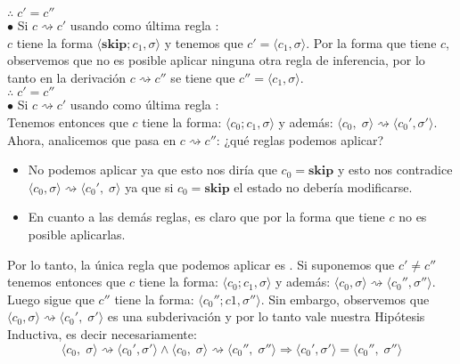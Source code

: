 \documentclass[11pt, fleqn]{article}
\begin{document}
$\therefore \; c' = c''$ \\



$\bullet$ Si $ c \rightsquigarrow c' $ usando como última regla : \\
$c$ tiene la forma $\langle \textbf{skip};c_1, \sigma \rangle$ y tenemos que $c' = \langle c_1, \sigma \rangle$.
Por la forma que tiene $c$, observemos que no es posible aplicar ninguna otra regla
de inferencia, por lo tanto en la derivación $ c \rightsquigarrow c'' $ se tiene que
$c'' = \langle c_1, \sigma \rangle$. \\

$\therefore \; c' = c''$ \\


$\bullet$ Si $ c \rightsquigarrow c' $ usando como última regla : \\
Tenemos entonces que $c$ tiene la forma: $\langle c_0;c_1, \sigma \rangle$ y
además:  $ \langle c_0, \; \sigma \rangle \rightsquigarrow \langle c_0', \sigma' \rangle$.
Ahora, analicemos que pasa en $ c \rightsquigarrow c'' $: ¿qué reglas podemos aplicar?

\begin{itemize}
      \item No podemos aplicar  ya que esto nos diría que $c_0 = \textbf{skip}$ y esto
            nos contradice $ \langle c_0, \sigma \rangle \rightsquigarrow \langle c_0', \; \sigma \rangle$ ya que
            si $c_0 = \textbf{skip}$ el estado no debería modificarse.
      \item En cuanto a las demás reglas, es claro que por la forma que tiene $c$ no es
            posible aplicarlas.
\end{itemize}

Por lo tanto, la única regla que podemos aplicar es . Si suponemos que 
$c' \neq c''$ tenemos entonces que $c$ tiene la forma: $\langle c_0;c_1,\sigma \rangle$ y
además:  $ \langle c_0, \sigma \rangle \rightsquigarrow \langle c_0'', \sigma'' \rangle$.
Luego sigue que $c''$ tiene la forma: $ \langle c_0'';c1, \sigma'' \rangle$.
Sin embargo, observemos que $ \langle c_0, \sigma \rangle \rightsquigarrow \langle c_0', \; \sigma' \rangle$
es una subderivación y por lo tanto vale nuestra Hipótesis Inductiva, es decir necesariamente:
\begin{equation*}
 \langle c_0, \; \sigma \rangle \rightsquigarrow \langle c_0', \sigma' \rangle \land \langle c_0, \; \sigma \rangle \rightsquigarrow \langle c_0'', \; \sigma'' \rangle
 \Rightarrow \langle c_0', \sigma' \rangle =  \langle c_0'', \; \sigma'' \rangle
\end{equation*}
\end{document}
